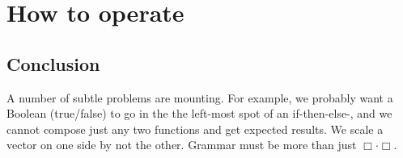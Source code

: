 \chapter{How to operate}







\section*{Conclusion}
A number of subtle problems are 
mounting.  For example, we probably want a Boolean (true/false) to 
go in the the left-most spot of an if-then-else-, and we cannot compose 
just any two functions and get expected results.  We scale a vector on one side 
by not the other.  Grammar must be more than just $\Box\cdot \Box$.

